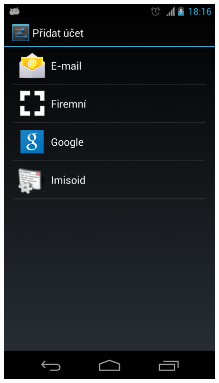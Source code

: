\documentclass{diplomka}
\begin{document}
\begin{figure}[H]
\begin{minipage}{.45\textwidth}
  \centering
  \includegraphics[width=.75\linewidth]{scr/addacc.png}
  \label{fig:addacc}
\end{minipage}
\end{figure}
\end{document}
